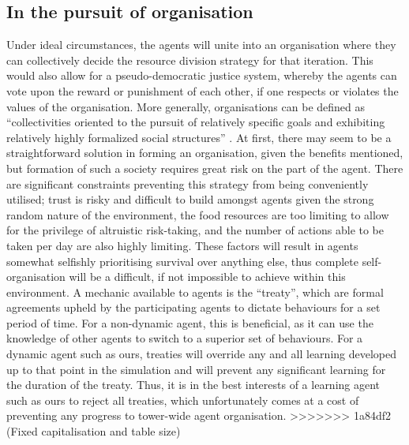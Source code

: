 \subsection{In the pursuit of organisation}\label{team2-organisation}
Under ideal circumstances, the agents will unite into an organisation where they can collectively decide the resource division strategy for that iteration. This would also allow for a pseudo-democratic justice system, whereby the agents can vote upon the reward or punishment of each other, if one respects or violates the values of the organisation. More generally, organisations can be defined as “collectivities oriented to the pursuit of relatively specific goals and exhibiting relatively highly formalized social structures” \cite{WhettenDavidA1983ORNa}. At first, there may seem to be a straightforward solution in forming an organisation, given the benefits mentioned, but formation of such a society requires great risk on the part of the agent. There are significant constraints preventing this strategy from being conveniently utilised; trust is risky and difficult to build amongst agents given the strong random nature of the environment, the food resources are too limiting to allow for the privilege of altruistic risk-taking, and the number of actions able to be taken per day are also highly limiting. These factors will result in agents somewhat selfishly prioritising survival over anything else, thus complete self-organisation will be a difficult, if not impossible to achieve within this environment. A mechanic available to agents is the “treaty”, which are formal agreements upheld by the participating agents to dictate behaviours for a set period of time. For a non-dynamic agent, this is beneficial, as it can use the knowledge of other agents to switch to a superior set of behaviours. For a dynamic agent such as ours, treaties will override any and all learning developed up to that point in the simulation and will prevent any significant learning for the duration of the treaty. Thus, it is in the best interests of a learning agent such as ours to reject all treaties, which unfortunately comes at a cost of preventing any progress to tower-wide agent organisation. 
>>>>>>> 1a84df2 (Fixed capitalisation and table size)

